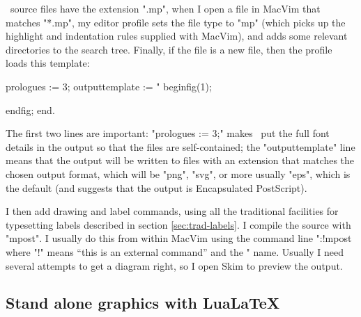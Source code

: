 \documentclass[a4paper,landscape]{article}
\begin{document}
\MP\ source files have the extension ".mp", when I open a file in MacVim that
matches "*.mp", my editor profile sets the file type to "mp" (which picks up the
highlight and indentation rules supplied with MacVim), and adds some relevant
directories to the search tree.  Finally, if the file is a new file, then the
profile loads this template:
\begin{smallcode}
prologues := 3;
outputtemplate := "%
beginfig(1);

endfig;
end.
\end{smallcode}
The first two lines are important: "prologues := 3;" makes \MP\ put the full font
details in the output so that the files are self-contained; the "outputtemplate"
line means that the output will be written to files with an extension that matches
the chosen output format, which will be "png", "svg", or more usually "eps", which
is the default (and suggests that the output is Encapsulated PostScript).

\smallskip

I then add drawing and label commands, using all the traditional facilities for
typesetting labels described in section \ref{sec:trad-labels}.  I compile the source
with "mpost". I usually do this from within MacVim using the command line ":!mpost %
where "!" means “this is an external command” and the "%
name.  Usually I need several attempts to get a diagram right, so I open Skim to preview the
output. 

\subsection{Stand alone graphics with Lua\LaTeX}\label{sec:sa-lua-flow}
\end{document}
